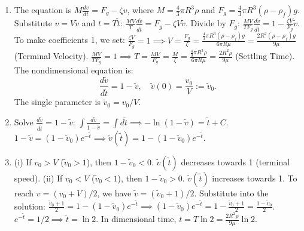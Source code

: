 \begin{solution}
\begin{enumerate}
    \item[(a)] The equation is $M \frac{dv}{dt} = F_g - \zeta v$, where $M = \frac{4}{3}\pi R^3 \rho$ and $F_g = \frac{4}{3}\pi R^3 (\rho - \rho_f)g$.
    Substitute $v = V \tilde{v}$ and $t = T \tilde{t}$:
    $\frac{M V}{T} \frac{d\tilde{v}}{d\tilde{t}} = F_g - \zeta V \tilde{v}$.
    Divide by $F_g$: $\frac{M V}{T F_g} \frac{d\tilde{v}}{d\tilde{t}} = 1 - \frac{\zeta V}{F_g} \tilde{v}$.
    To make coefficients 1, we set:
    $\frac{\zeta V}{F_g} = 1 \implies V = \frac{F_g}{\zeta} = \frac{\frac{4}{3}\pi R^3 (\rho - \rho_f)g}{6\pi R \mu} = \frac{2 R^2 (\rho - \rho_f)g}{9 \mu}$ (Terminal Velocity).
    $\frac{M V}{T F_g} = 1 \implies T = \frac{M V}{F_g} = \frac{M}{\zeta} = \frac{\frac{4}{3}\pi R^3 \rho}{6\pi R \mu} = \frac{2 R^2 \rho}{9 \mu}$ (Settling Time).
    The nondimensional equation is:
    \[
    \frac{d\tilde{v}}{d\tilde{t}} = 1 - \tilde{v}, \quad \tilde{v}(0) = \frac{v_0}{V} := \tilde{v}_0.
    \]
    The single parameter is $\tilde{v}_0 = v_0/V$.

    \item[(b)] Solve $\frac{d\tilde{v}}{d\tilde{t}} = 1 - \tilde{v}$:
    $\int \frac{d\tilde{v}}{1 - \tilde{v}} = \int d\tilde{t} \implies -\ln(1 - \tilde{v}) = \tilde{t} + C$.
    $1 - \tilde{v} = (1 - \tilde{v}_0) e^{-\tilde{t}} \implies \tilde{v}(\tilde{t}) = 1 - (1 - \tilde{v}_0) e^{-\tilde{t}}$.

    \item[(c)] 
    (i) If $v_0 > V$ ($\tilde{v}_0 > 1$), then $1 - \tilde{v}_0 < 0$. $\tilde{v}(\tilde{t})$ decreases towards 1 (terminal speed).
    (ii) If $v_0 < V$ ($\tilde{v}_0 < 1$), then $1 - \tilde{v}_0 > 0$. $\tilde{v}(\tilde{t})$ increases towards 1.
    To reach $v = (v_0 + V)/2$, we have $\tilde{v} = (\tilde{v}_0 + 1)/2$.
    Substitute into the solution:
    $\frac{\tilde{v}_0 + 1}{2} = 1 - (1 - \tilde{v}_0) e^{-\tilde{t}} \implies (1 - \tilde{v}_0) e^{-\tilde{t}} = 1 - \frac{\tilde{v}_0 + 1}{2} = \frac{1 - \tilde{v}_0}{2}$.
    $e^{-\tilde{t}} = 1/2 \implies \tilde{t} = \ln 2$.
    In dimensional time, $t = T \ln 2 = \frac{2 R^2 \rho}{9 \mu} \ln 2$.
\end{enumerate}
\end{solution}

